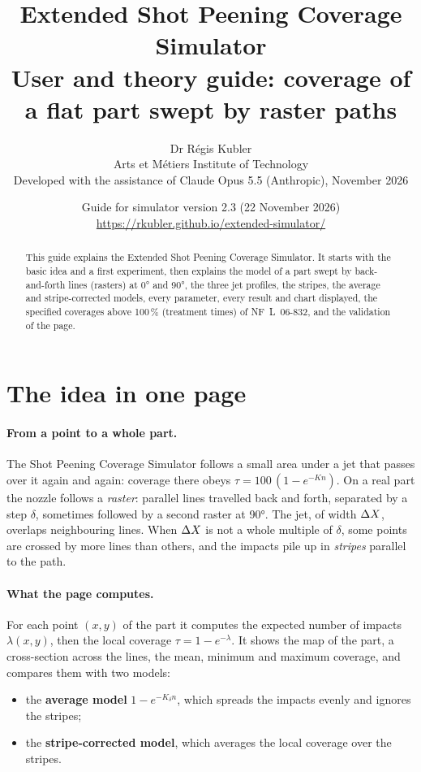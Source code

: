 \documentclass[11pt,a4paper]{article}
\title{\textbf{Extended Shot Peening Coverage Simulator}\\[3pt]
\large User and theory guide: coverage of a flat part swept by raster paths}
\author{Dr Régis Kubler\\ Arts et Métiers Institute of Technology\\[4pt]
\small Developed with the assistance of Claude Opus 5.5 (Anthropic), November 2026}
\date{Guide for simulator version 2.3 (22 November 2026)\\ \url{https://rkubler.github.io/extended-simulator/}}
\begin{document}
\maketitle
\thispagestyle{fancy}

\begin{abstract}
\noindent This guide explains the Extended Shot Peening Coverage Simulator. It starts with the basic idea and a first experiment, then explains the model of a part swept by back-and-forth lines (rasters) at 0° and 90°, the three jet profiles, the stripes, the average and stripe-corrected models, every parameter, every result and chart displayed, the specified coverages above 100\,\% (treatment times) of NF~L~06-832, and the validation of the page.
\end{abstract}

\tableofcontents

\section{The idea in one page}

\paragraph{From a point to a whole part.} The Shot Peening Coverage Simulator follows a small area under a jet that passes over it again and again: coverage there obeys $\tau=100\,(1-e^{-Kn})$. On a real part the nozzle follows a \emph{raster}: parallel lines travelled back and forth, separated by a step $\delta$, sometimes followed by a second raster at 90°. The jet, of width $\Delta X$, overlaps neighbouring lines. When $\Delta X$ is not a whole multiple of $\delta$, some points are crossed by more lines than others, and the impacts pile up in \emph{stripes} parallel to the path.

\paragraph{What the page computes.} For each point $(x,y)$ of the part it computes the expected number of impacts $\lambda(x,y)$, then the local coverage $\tau=1-e^{-\lambda}$. It shows the map of the part, a cross-section across the lines, the mean, minimum and maximum coverage, and compares them with two models:
\begin{itemize}[nosep]
\item the \textbf{average model} $1-e^{-K_\delta n}$, which spreads the impacts evenly and ignores the stripes;
\item the \textbf{stripe-corrected model}, which averages the local coverage over the stripes.
\end{itemize}
\end{document}

